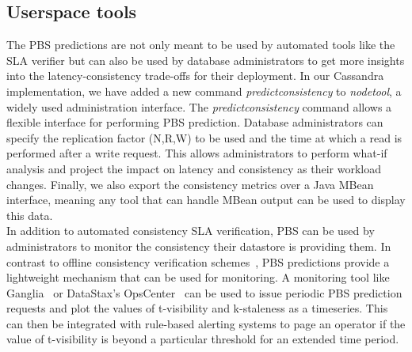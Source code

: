\subsection{Userspace tools}
The PBS predictions are not only meant to be used by automated tools like the
SLA verifier but can also be used by database administrators to get more
insights into the latency-consistency trade-offs for their deployment. In our
Cassandra implementation, we have added a new command
\textit{predictconsistency} to \textit{nodetool}, a widely used administration
interface.  The \textit{predictconsistency} command allows a flexible interface
for performing PBS prediction. Database administrators can specify the
replication factor (N,R,W) to be used and the time at which a read is performed
after a write request. This allows administrators to perform what-if analysis
and project the impact on latency and consistency as their workload changes.
Finally, we also export the consistency metrics over a Java MBean interface,
meaning any tool that can handle MBean output can be used to display this
data.\\


In addition to automated consistency SLA verification, PBS can be used by administrators
to monitor the consistency their datastore is providing them. In contrast to
offline consistency verification schemes~\cite{podc-hp}, PBS predictions provide
a lightweight mechanism that can be used for monitoring. A monitoring tool like
Ganglia~\cite{massie2004ganglia} or DataStax's OpsCenter~\cite{datastax-opscenter} can be used to
issue  periodic PBS prediction requests and plot the values of t-visibility and
k-staleness as a timeseries. This can then be integrated with rule-based
alerting systems to page an operator if the value of t-visibility is beyond a
particular threshold for an extended time period.
